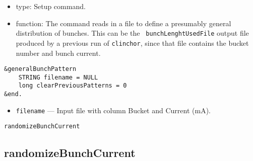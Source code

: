 \documentclass[11pt]{article}
\begin{document}
\begin{itemize}
\item type: Setup command.
\item function: The command reads in a file to define a presumably
    general distribution of bunches. This can be the {\tt
    bunchLenghtUsedFile} output file produced by a previous run of
    {\tt clinchor}, since that file contains the bucket number and
    bunch current.
\end{itemize}
\begin{verbatim}
&generalBunchPattern
    STRING filename = NULL
    long clearPreviousPatterns = 0
&end.
\end{verbatim}
\begin{itemize}
\item {\tt filename} --- Input file with column Bucket and Current (mA).
\end{itemize}


\newpage
\begin{center}\tt randomizeBunchCurrent\end{center}
\subsection{randomizeBunchCurrent}
\end{document}
